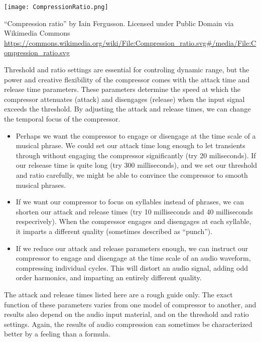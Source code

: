 \begin{marginfigure}
  \texttt{[image: CompressionRatio.png]}
  \caption{``Compression ratio'' by Iain Fergusson. Licensed under
     Public Domain via Wikimedia Commons 
     \url{https://commons.wikimedia.org/wiki/File:Compression_ratio.svg\#/media/File:Compression_ratio.svg}
   }
  \label{fig:comp-ratio}
\end{marginfigure}

Threshold and ratio settings are essential for controling dynamic
range, but the power and creative flexibility of the compressor comes
with the attack time and release time parameters. These parameters
determine the speed at which the compressor attenuates (attack) and
disengages (release) when the input signal exceeds the threshold. By
adjusting the attack and release times, we can change the temporal
focus of the compressor.
\begin{itemize}
\item Perhaps we want the compressor to engage or disengage at the
  time scale of a musical phrase. We could set our attack time long
  enough to let transients through without engaging the compressor
  significantly (try 20 miliseconds). If our relsease time is quite
  long (try 300 milliseconds), and we set our threshold and ratio
  carefully, we might be able to convince the compressor to smooth
  musical phrases.
\item If we want our compressor to focus on syllables instead of
  phrases, we can shorten our attack and release times (try 10
  milliseconds and 40 milliseconds respecrively). When the compressor
  engages and disengages at each syllable, it imparts a different
  quality (sometimes described as ``punch'').
\item If we reduce our attack and release parameters enough, we can
  instruct our compressor to engage and disengage at the time scale of
  an audio waveform, compressing individual cycles. This will distort
  an audio signal, adding odd order harmonics, and imparting an entirely different quality.
\end{itemize}
The attack and release times listed here are a rough guide only.  The
exact function of these parameters varies from one model of compressor
to another, and results also depend on the audio input material, and
on the threshold and ratio settings. Again, the results of audio
compression can sometimes be characterized better by a feeling than a
formula.


